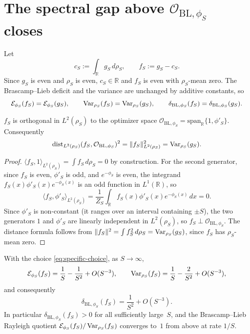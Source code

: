 \section{\texorpdfstring{The spectral gap above
$\mathcal O_{\mathrm{BL},\phi_S}$ closes}{The spectral gap above OBL closes}}

Let
\[
  c_S := \int_{\mathbb R} g_S\,d\rho_S,\qquad
  f_S := g_S - c_S.
\]
Since $g_S$ is even and $\rho_S$ is even, $c_S\in\mathbb R$ and $f_S$ is even
with $\rho_S$-mean zero. The Brascamp--Lieb deficit and the variance are
unchanged by additive constants, so
\begin{equation}\label{eq:fS-vs-gS}
  \mathcal E_{\phi_S}(f_S)=\mathcal E_{\phi_S}(g_S),\qquad
  \operatorname{Var}_{\rho_S}(f_S)=\operatorname{Var}_{\rho_S}(g_S),\qquad
  \delta_{\mathrm{BL},\phi_S}(f_S)=\delta_{\mathrm{BL},\phi_S}(g_S).
\end{equation}

\begin{lemma}\label{lem:orth}
$f_S$ is orthogonal in $L^2(\rho_S)$ to the optimizer space
$\mathcal O_{\mathrm{BL},\phi_S}=\mathrm{span}_{\mathbb R}\{1,\phi'_S\}$.
Consequently
\[
  \operatorname{dist}_{L^2(\rho_S)}(f_S,\mathcal O_{\mathrm{BL},\phi_S})^2
  =\|f_S\|_{L^2(\rho_S)}^2
  =\operatorname{Var}_{\rho_S}(g_S).
\]
\end{lemma}

\begin{proof}
$\langle f_S,1\rangle_{L^2(\rho_S)}=\int f_S\,d\rho_S=0$ by construction. For
the second generator, since $f_S$ is even, $\phi'_S$ is odd, and $e^{-\phi_S}$
is even, the integrand $f_S(x)\phi'_S(x)e^{-\phi_S(x)}$ is an odd function in
$L^1(\mathbb R)$, so
\[
  \langle f_S,\phi'_S\rangle_{L^2(\rho_S)}
  =\frac{1}{Z_S}\int_{\mathbb R}f_S(x)\phi'_S(x)e^{-\phi_S(x)}\,dx
  =0.
\]
Since $\phi'_S$ is non-constant (it ranges over an interval containing
$\pm S$), the two generators $1$ and $\phi'_S$ are linearly independent in
$L^2(\rho_S)$, so $f_S\perp\mathcal O_{\mathrm{BL},\phi_S}$. The distance
formula follows from $\|f_S\|^2=\int f_S^2\,d\rho_S=\operatorname{Var}_{\rho_S}(g_S)$,
since $f_S$ has $\rho_S$-mean zero.
\end{proof}

\begin{proposition}\label{prop:asymptotics}
With the choice \eqref{eq:specific-choice}, as $S\to\infty$,
\[
  \mathcal E_{\phi_S}(f_S) = \frac{1}{S}-\frac{1}{S^2}+O(S^{-3}),
  \qquad
  \operatorname{Var}_{\rho_S}(f_S) = \frac{1}{S}-\frac{2}{S^2}+O(S^{-3}),
\]
and consequently
\[
  \delta_{\mathrm{BL},\phi_S}(f_S)
  = \frac{1}{S^2}+O(S^{-3}).
\]
In particular $\delta_{\mathrm{BL},\phi_S}(f_S)>0$ for all sufficiently
large~$S$, and the Brascamp--Lieb Rayleigh quotient
$\mathcal E_{\phi_S}(f_S)/\operatorname{Var}_{\rho_S}(f_S)$ converges to~$1$ from above at
rate $1/S$.
\end{proposition}

